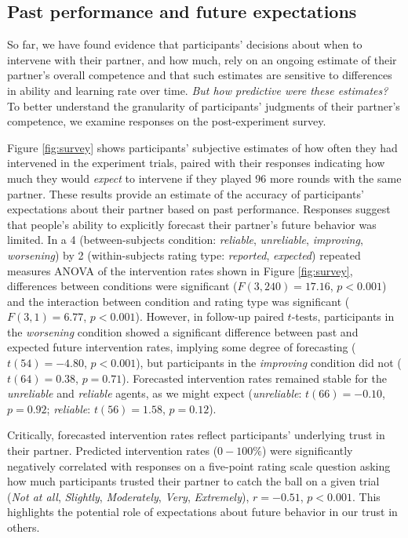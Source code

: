 \documentclass[10pt,letterpaper]{article}
\begin{document}
\subsection{Past performance and future expectations}

So far, we have found evidence that participants' decisions about when to intervene with their partner, and how much, rely on an ongoing estimate of their partner's overall competence and that such estimates are sensitive to differences in ability and learning rate over time. \textit{But how predictive were these estimates?} To better understand the granularity of participants' judgments of their partner's competence, we examine responses on the post-experiment survey. 

Figure \ref{fig:survey} shows participants' subjective estimates of how often they had intervened in the experiment trials, paired with their responses indicating how much they would \textit{expect} to intervene if they played 96 more rounds with the same partner. These results provide an estimate of the accuracy of participants' expectations about their partner based on past performance. Responses suggest that people's ability to explicitly forecast their partner's future behavior was limited. In a 4 (between-subjects condition: \textit{reliable}, \textit{unreliable}, \textit{improving}, \textit{worsening}) by 2 (within-subjects rating type: \textit{reported}, \textit{expected}) repeated measures ANOVA of the intervention rates shown in Figure \ref{fig:survey}, differences between conditions were significant ($F(3, 240) = 17.16$, $p < 0.001$) and the interaction between condition and rating type was significant ($F(3, 1) = 6.77$, $p < 0.001$). However, in follow-up paired $t$-tests, participants in the \textit{worsening} condition showed a significant difference between past and expected future intervention rates, implying some degree of forecasting ($t(54) = -4.80$, $p < 0.001$), but participants in the \textit{improving} condition did not ($t(64) = 0.38$, $p = 0.71$). Forecasted intervention rates remained stable for the \textit{unreliable} and \textit{reliable} agents, as we might expect (\textit{unreliable}: $t(66) = -0.10$, $p = 0.92$; \textit{reliable}: $t(56) = 1.58$, $p = 0.12$). 

Critically, forecasted intervention rates reflect participants' underlying trust in their partner. Predicted intervention rates ($0-100\%$) were significantly negatively correlated with responses on a five-point rating scale question asking how much participants trusted their partner to catch the ball on a given trial (\textit{Not at all}, \textit{Slightly}, \textit{Moderately}, \textit{Very}, \textit{Extremely}), $r = -0.51$, $p < 0.001$. This highlights the potential role of expectations about future behavior in our trust in others.
\end{document}
